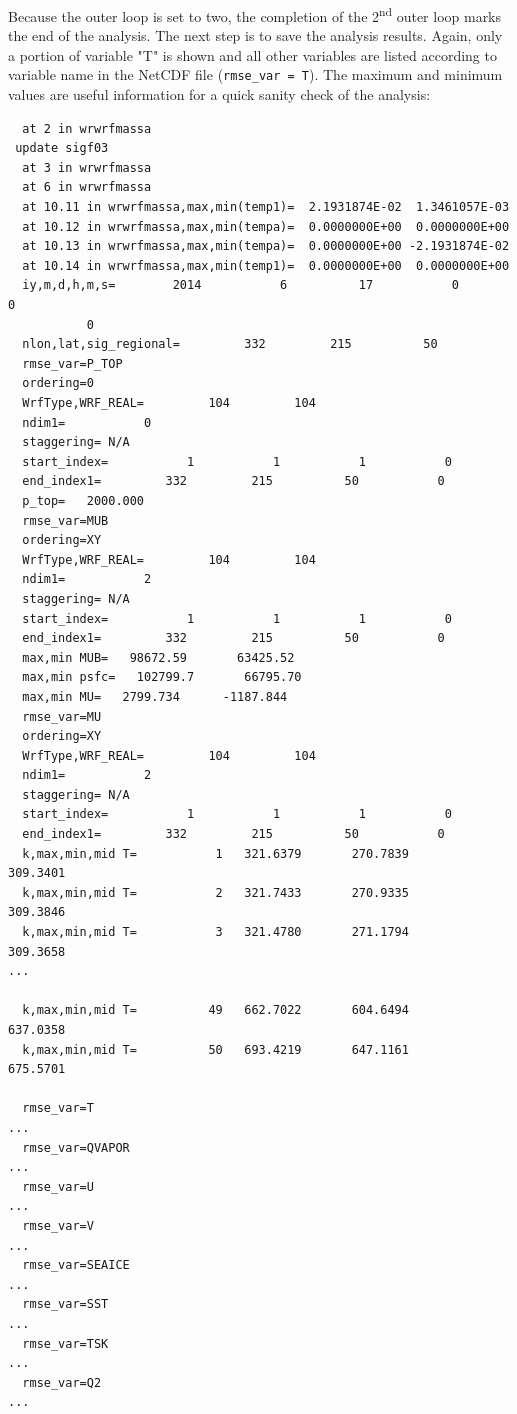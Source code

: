 Because the outer loop is set to two, the completion of the 2\textsuperscript{nd} outer loop marks the end of the analysis. The next step is to save the analysis results. Again, only a portion of variable "T" is shown and all other variables are listed according to variable name in the NetCDF file (\verb|rmse_var = T|). The maximum and minimum values are useful information for a quick sanity check of the analysis:

\begin{scriptsize}
\begin{verbatim} 
  at 2 in wrwrfmassa
 update sigf03
  at 3 in wrwrfmassa
  at 6 in wrwrfmassa
  at 10.11 in wrwrfmassa,max,min(temp1)=  2.1931874E-02  1.3461057E-03
  at 10.12 in wrwrfmassa,max,min(tempa)=  0.0000000E+00  0.0000000E+00
  at 10.13 in wrwrfmassa,max,min(tempa)=  0.0000000E+00 -2.1931874E-02
  at 10.14 in wrwrfmassa,max,min(temp1)=  0.0000000E+00  0.0000000E+00
  iy,m,d,h,m,s=        2014           6          17           0           0
           0
  nlon,lat,sig_regional=         332         215          50
  rmse_var=P_TOP
  ordering=0
  WrfType,WRF_REAL=         104         104
  ndim1=           0
  staggering= N/A
  start_index=           1           1           1           0
  end_index1=         332         215          50           0
  p_top=   2000.000
  rmse_var=MUB
  ordering=XY
  WrfType,WRF_REAL=         104         104
  ndim1=           2
  staggering= N/A
  start_index=           1           1           1           0
  end_index1=         332         215          50           0
  max,min MUB=   98672.59       63425.52
  max,min psfc=   102799.7       66795.70
  max,min MU=   2799.734      -1187.844
  rmse_var=MU
  ordering=XY
  WrfType,WRF_REAL=         104         104
  ndim1=           2
  staggering= N/A
  start_index=           1           1           1           0
  end_index1=         332         215          50           0
  k,max,min,mid T=           1   321.6379       270.7839       309.3401
  k,max,min,mid T=           2   321.7433       270.9335       309.3846
  k,max,min,mid T=           3   321.4780       271.1794       309.3658
...

  k,max,min,mid T=          49   662.7022       604.6494       637.0358
  k,max,min,mid T=          50   693.4219       647.1161       675.5701

  rmse_var=T
...
  rmse_var=QVAPOR
...
  rmse_var=U
...
  rmse_var=V
...
  rmse_var=SEAICE
...
  rmse_var=SST
...
  rmse_var=TSK
...
  rmse_var=Q2
...
\end{verbatim}
\end{scriptsize}
